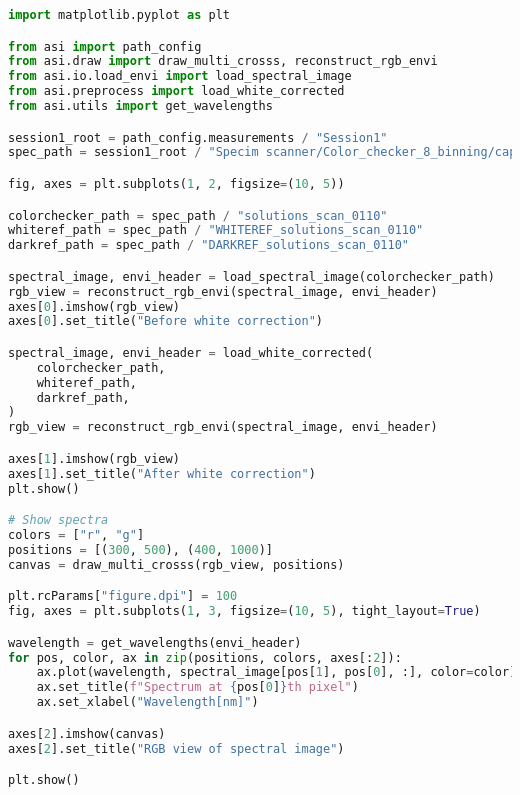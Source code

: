 \begin{lstlisting}[language=python, caption=White correction for Specium Scanner, label={code:wc-specim-scanner}]
import matplotlib.pyplot as plt

from asi import path_config
from asi.draw import draw_multi_crosss, reconstruct_rgb_envi
from asi.io.load_envi import load_spectral_image
from asi.preprocess import load_white_corrected
from asi.utils import get_wavelengths

session1_root = path_config.measurements / "Session1"
spec_path = session1_root / "Specim scanner/Color_checker_8_binning/capture"

fig, axes = plt.subplots(1, 2, figsize=(10, 5))

colorchecker_path = spec_path / "solutions_scan_0110"
whiteref_path = spec_path / "WHITEREF_solutions_scan_0110"
darkref_path = spec_path / "DARKREF_solutions_scan_0110"

spectral_image, envi_header = load_spectral_image(colorchecker_path)
rgb_view = reconstruct_rgb_envi(spectral_image, envi_header)
axes[0].imshow(rgb_view)
axes[0].set_title("Before white correction")

spectral_image, envi_header = load_white_corrected(
    colorchecker_path,
    whiteref_path,
    darkref_path,
)
rgb_view = reconstruct_rgb_envi(spectral_image, envi_header)

axes[1].imshow(rgb_view)
axes[1].set_title("After white correction")
plt.show()

# Show spectra
colors = ["r", "g"]
positions = [(300, 500), (400, 1000)]
canvas = draw_multi_crosss(rgb_view, positions)

plt.rcParams["figure.dpi"] = 100
fig, axes = plt.subplots(1, 3, figsize=(10, 5), tight_layout=True)

wavelength = get_wavelengths(envi_header)
for pos, color, ax in zip(positions, colors, axes[:2]):
    ax.plot(wavelength, spectral_image[pos[1], pos[0], :], color=color)
    ax.set_title(f"Spectrum at {pos[0]}th pixel")
    ax.set_xlabel("Wavelength[nm]")

axes[2].imshow(canvas)
axes[2].set_title("RGB view of spectral image")

plt.show()
\end{lstlisting}
